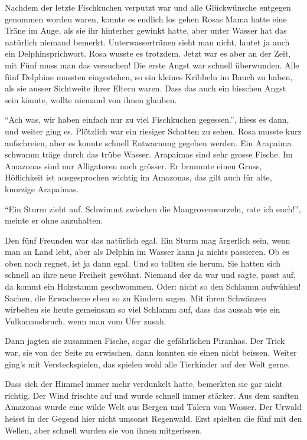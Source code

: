 Nachdem der letzte Fischkuchen verputzt war und alle Glückwünsche entgegen genommen worden waren, konnte es endlich los gehen Rosas Mama hatte eine Träne im Auge, als sie ihr hinterher gewinkt hatte, aber unter Wasser hat das natürlich niemand bemerkt. Unterwassertränen sieht man nicht, lautet ja auch ein Delphinsprichwort. Rosa wusste es trotzdem. Jetzt war es aber an der Zeit, mit Fünf muss man das versuchen! Die erste Angst war schnell überwunden. Alle fünf Delphine mussten eingestehen, so ein kleines Kribbeln im Bauch zu haben, als sie ausser Sichtweite ihrer Eltern waren. Dass das auch ein bisschen Angst sein könnte, wollte niemand von ihnen glauben.

\enquote{Ach was, wir haben einfach nur zu viel Fischkuchen gegessen.}, hiess es dann, und weiter ging es. Plötzlich war ein riesiger Schatten zu sehen. Rosa musste kurz aufschreien, aber es konnte schnell Entwarnung gegeben werden. Ein Arapaima schwamm träge durch das trübe Wasser. Arapaimas sind sehr grosse Fische. Im Amazonas sind nur Alligatoren noch grösser. Er brummte einen Gruss, Höflichkeit ist ausgesprochen wichtig im Amazonas, das gilt auch für alte, knorzige Arapaimas.

\enquote{Ein Sturm zieht auf. Schwimmt zwischen die Mangrovenwurzeln, rate ich euch!}, meinte er ohne anzuhalten. 

Den fünf Freunden war das natürlich egal. Ein Sturm mag ärgerlich sein, wenn man an Land lebt, aber als Delphin im Wasser kann ja nichts passieren. Ob es oben noch regnet, ist ja dann egal. Und so tollten sie herum. Sie hatten sich schnell an ihre neue Freiheit gewöhnt. Niemand der da war und sagte, passt auf, da kommt ein Holzstamm geschwommen. Oder: nicht so den Schlamm aufwühlen! Sachen, die Erwachsene eben so zu Kindern sagen. Mit ihren Schwänzen wirbelten sie heute gemeinsam so viel Schlamm auf, dass das aussah wie ein Vulkanausbruch, wenn man vom Ufer zusah.

Dann jagten sie zusammen Fische, sogar die gefährlichen Piranhas. Der Trick war, sie von der Seite zu erwischen, dann konnten sie einen nicht beissen. Weiter ging's mit Versteckspielen, das spielen wohl alle Tierkinder auf der Welt gerne.

Dass sich der Himmel immer mehr verdunkelt hatte, bemerkten sie gar nicht richtig. Der Wind frischte auf und wurde schnell immer stärker. Aus dem sanften Amazonas wurde eine wilde Welt aus Bergen und Tälern von Wasser. Der Urwald heisst in der Gegend hier nicht umsonst Regenwald. Erst spielten die fünf mit den Wellen, aber schnell wurden sie von ihnen mitgerissen.

